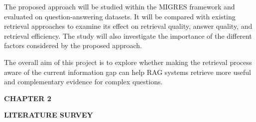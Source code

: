 \documentclass[12pt,a4paper]{report}
\newcommand{\chaptertitle}[2]{
    \begin{center}
        {\fontsize{18}{21}\selectfont\bfseries CHAPTER #1\par}
        \vspace{0.10in}
        {\fontsize{18}{21}\selectfont\bfseries #2\par}
    \end{center}
    \vspace{0.12in}
}
\begin{document}
The proposed approach will be studied within the MIGRES framework and evaluated on question-answering datasets. It will be compared with existing retrieval approaches to examine its effect on retrieval quality, answer quality, and retrieval efficiency. The study will also investigate the importance of the different factors considered by the proposed approach.

The overall aim of this project is to explore whether making the retrieval process aware of the current information gap can help RAG systems retrieve more useful and complementary evidence for complex questions.

\clearpage




\chaptertitle{2}{LITERATURE SURVEY}
\small
\end{document}

